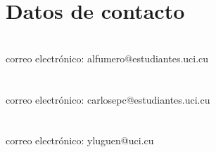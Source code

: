 \section*{Datos de contacto}
\noindent\autorA\\
	correo electrónico: alfumero@estudiantes.uci.cu
	\\\\
	\autorB\\
	correo electrónico: carlosepc@estudiantes.uci.cu
	\\\\
	\tutorA\\
	correo electrónico: yluguen@uci.cu

	